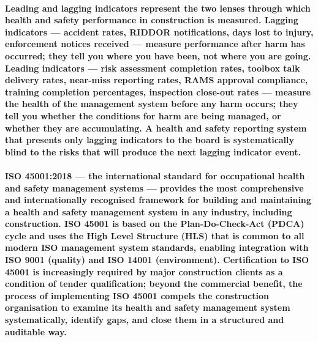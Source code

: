 \paragraph{Leading and lagging indicators represent the two lenses through which health and safety performance in construction is measured. Lagging indicators --- accident rates, RIDDOR notifications, days lost to injury, enforcement notices received --- measure performance after harm has occurred; they tell you where you have been, not where you are going. Leading indicators --- risk assessment completion rates, toolbox talk delivery rates, near-miss reporting rates, RAMS approval compliance, training completion percentages, inspection close-out rates --- measure the health of the management system before any harm occurs; they tell you whether the conditions for harm are being managed, or whether they are accumulating. A health and safety reporting system that presents only lagging indicators to the board is systematically blind to the risks that will produce the next lagging indicator event.}

\paragraph{ISO 45001:2018 --- the international standard for occupational health and safety management systems --- provides the most comprehensive and internationally recognised framework for building and maintaining a health and safety management system in any industry, including construction. ISO 45001 is based on the Plan-Do-Check-Act (PDCA) cycle and uses the High Level Structure (HLS) that is common to all modern ISO management system standards, enabling integration with ISO 9001 (quality) and ISO 14001 (environment). Certification to ISO 45001 is increasingly required by major construction clients as a condition of tender qualification; beyond the commercial benefit, the process of implementing ISO 45001 compels the construction organisation to examine its health and safety management system systematically, identify gaps, and close them in a structured and auditable way.}


